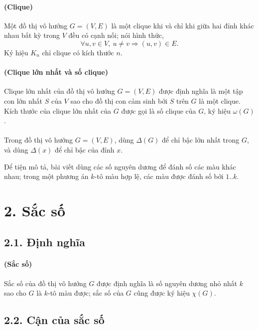 \documentclass[11pt]{article}
\begin{document}
\paragraph{ (Clique)}
Một đồ thị vô hướng \(G=(V,E)\) là một clique khi và chỉ khi giữa hai đỉnh
khác nhau bất kỳ trong \(V\) đều có cạnh nối; nói hình thức,
\[
  \forall u,v\in V,\ u\ne v\Longrightarrow (u,v)\in E.
\]
Ký hiệu \(K_n\) chỉ clique có kích thước \(n\).

\paragraph{ (Clique lớn nhất và số clique)}
Clique lớn nhất của đồ thị vô hướng \(G=(V,E)\) được định nghĩa là một tập con
lớn nhất \(S\) của \(V\) sao cho đồ thị con cảm sinh bởi \(S\) trên \(G\) là
một clique. Kích thước của clique lớn nhất của \(G\) được gọi là số clique của
\(G\), ký hiệu \(\omega(G)\).

\paragraph{}
Trong đồ thị vô hướng \(G=(V,E)\), dùng \(\Delta(G)\) để chỉ bậc lớn nhất
trong \(G\), và dùng \(\Delta(x)\) để chỉ bậc của đỉnh \(x\).

Để tiện mô tả, bài viết dùng các số nguyên dương để đánh số các màu khác
nhau; trong một phương án \(k\)-tô màu hợp lệ, các màu được đánh số bởi
\(1..k\).

\section*{2. Sắc số}

\subsection*{2.1. Định nghĩa}

\paragraph{ (Sắc số)}
Sắc số của đồ thị vô hướng \(G\) được định nghĩa là số nguyên dương nhỏ nhất
\(k\) sao cho \(G\) là \(k\)-tô màu được; sắc số của \(G\) cũng được ký hiệu
\(\chi(G)\).

\subsection*{2.2. Cận của sắc số}
\end{document}

